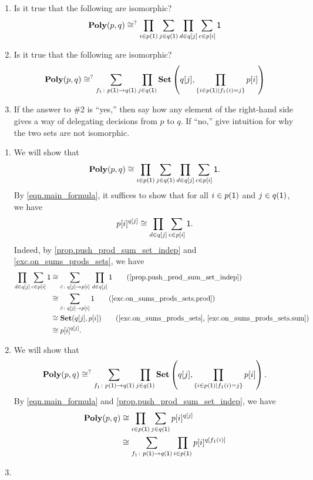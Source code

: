 \documentclass[Book-Poly]{subfiles}
\begin{document}
\begin{exercise}\label{exc.practice_sum_prod}
\begin{enumerate}
\item Is it true that the following are isomorphic?
\begin{equation}\label{eqn.poly_p_q}
  \textbf{Poly}(p,q)
  \cong^?
  \prod_{i\in p(\textsf{1})}\sum_{j\in q(\textsf{1})}\prod_{d\in q[j]}\sum_{c\in p[i]}\textsf{1}
\end{equation}
\item Is it true that the following are isomorphic?
	\begin{equation}\label{eqn.useful_misc472}
	\textbf{Poly}(p,q)\cong^?\sum_{f_1\colon p(\textsf{1})\to q(\textsf{1})}\prod_{j\in q(\textsf{1})}\textbf{Set}\left(q[j],\prod_{\{i\in p(\textsf{1})\mid f_1(i)= j\}}p[i]\right)
	\end{equation}
\item If the answer to \#2 is ``yes,'' then say how any element of the right-hand side gives a way of delegating decisions from $p$ to $q$. If ``no,'' give intuition for why the two sets are not isomorphic.
\qedhere
\end{enumerate}
\begin{solution}
\begin{enumerate}
\item We will show that
\[
  \textbf{Poly}(p,q)
  \cong
  \prod_{i\in p(\textsf{1})}\sum_{j\in q(\textsf{1})}\prod_{d\in q[j]}\sum_{c\in p[i]}\textsf{1}.
\]
By \eqref{eqn.main_formula}, it suffices to show that for all $i \in p(\textsf{1})$ and $j \in q(\textsf{1})$, we have
\[
    p[i]^{q[j]} \cong \prod_{d \in q[j]} \sum_{c \in p[i]} \textsf{1}.
\]
Indeed, by \cref{prop.push_prod_sum_set_indep} and \cref{exc.on_sums_prods_sets}, we have
\begin{align*}
    \prod_{d \in q[j]} \sum_{c \in p[i]} \1 &\iso \sum_{\bar{c} \colon q[j] \to p[i]} \, \prod_{d \in q[j]} \1 \tag{\cref{prop.push_prod_sum_set_indep}} \\
    &\iso \sum_{\bar{c} \colon q[j] \to p[i]} \1 \tag{\cref{exc.on_sums_prods_sets.prod}} \\
    &\iso \smset(q[j], p[i]) \tag{\cref{exc.on_sums_prods_sets}, \cref{exc.on_sums_prods_sets.sum}} \\
    &\iso p[i]^{q[j]}.
\end{align*}

\item We will show that
\[
	\textbf{Poly}(p,q)\cong^?\sum_{f_1\colon p(\textsf{1})\to q(\textsf{1})}\prod_{j\in q(\textsf{1})}\textbf{Set}\left(q[j],\prod_{\{i\in p(\textsf{1})\mid f_1(i)= j\}}p[i]\right).
\]
By \eqref{eqn.main_formula} and \cref{prop.push_prod_sum_set_indep}, we have
\begin{align*}
    \textbf{Poly}(p, q) &\cong \prod_{i \in p(\textsf{1})} \sum_{j \in q(\textsf{1})} p[i]^{q[j]} \\
    &\cong \sum_{f_1 \colon p(\textsf{1}) \to q(\textsf{1})} \prod_{i \in p(\textsf{1})} p[i]^{q[f_1(i)]}
\end{align*}

\item 
\end{enumerate}
\end{solution}
\end{exercise}
\end{document}
